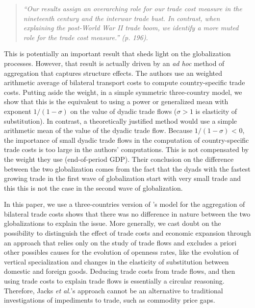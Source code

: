 \documentclass{article}
\begin{document}
\begin{quote}
\emph{``Our results assign an overarching role for our trade
cost measure in the nineteenth century and the interwar trade
bust. In contrast, when explaining the post-World War II trade
boom, we identify a more muted role for the trade cost
measure.'' (p. 196)}.
\end{quote}

This is potentially an important result that sheds light on the globalization processes.
However, that result is actually driven by an \textit{ad hoc} method of aggregation that captures structure effects.
The authors use an weighted arithmetic average of bilateral transport costs to compute country-specific trade costs. Putting aside the weight, in a simple symmetric three-country model, we show that this is the equivalent to using a power or generalized mean with exponent $1/(1-\sigma)$ on the value of dyadic trade flows ($\sigma > 1$ is elasticity of substitution).
In contrast, a theoretically justified method would use a simple arithmetic mean of the value of the dyadic trade flow. 
Because $1/(1-\sigma)$ < 0, the importance of small dyadic trade flows in the computation of country-specific trade costs is too large in the authors' computations.
This is not compensated by the weight they use (end-of-period GDP).
Their conclusion on the difference between the two globalization comes from the fact that the dyads with the fastest growing trade in the first wave of globalization start with very small trade and this this is not the case in the second wave of globalization.

In this paper, we use a three-countries version of \cite{AW2003}'s model for the aggregation of bilateral trade costs shows that there was no difference in nature between the two globalizations to explain the issue.
More generally, we cast doubt on the possibility to distinguish the effect of trade costs and economic expansion through an approach that relies only on the study of trade flows and excludes a priori other possibles causes for the evolution of openness rates, like the evolution of vertical specialization and changes in the elasticity of substitution between domestic and foreign goods.
Deducing trade costs from trade flows, and then using trade costs to explain trade flows is essentially a circular reasoning.
Therefore, Jacks \textit{et al.}'s approach cannot be an alternative to traditional investigations of impediments to trade, such as commodity price gaps.
\end{document}
